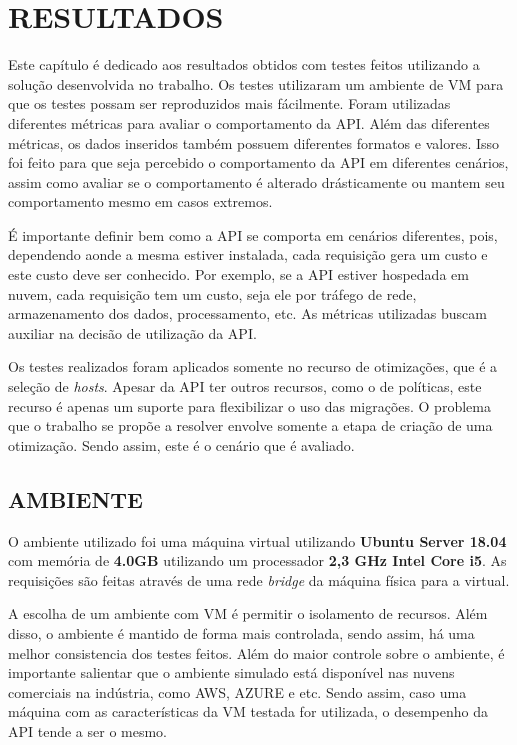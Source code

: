 \chapter{RESULTADOS}
\label{chap:results}

Este capítulo é dedicado aos resultados obtidos com testes
feitos utilizando a solução desenvolvida no trabalho. Os testes
utilizaram um ambiente de VM para que os testes possam ser reproduzidos 
mais fácilmente. Foram utilizadas diferentes métricas para avaliar
o comportamento da API. Além das diferentes métricas, os dados inseridos 
também possuem diferentes formatos e valores. Isso foi feito para que 
seja percebido o comportamento da API em diferentes cenários, assim como
avaliar se o comportamento é alterado drásticamente ou mantem seu comportamento
mesmo em casos extremos.

É importante definir bem como a API se comporta em cenários diferentes, pois,
dependendo aonde a mesma estiver instalada, cada requisição gera um custo e este custo 
deve ser conhecido. Por exemplo, se a API estiver hospedada em nuvem, cada requisição tem 
um custo, seja ele por tráfego de rede, armazenamento dos dados, processamento, etc. 
As métricas utilizadas buscam auxiliar na decisão de utilização da API.

Os testes realizados foram aplicados somente no recurso de otimizações,
que é a seleção de \textit{hosts}. Apesar da API ter outros recursos, como o de políticas,
este recurso é apenas um suporte para flexibilizar o uso das migrações. O problema 
que o trabalho se propõe a resolver envolve somente a etapa de criação de uma
otimização. Sendo assim, este é o cenário que é avaliado.

\section{AMBIENTE}

O ambiente utilizado foi uma máquina virtual utilizando \textbf{Ubuntu Server 18.04}
com memória de \textbf{4.0GB} utilizando um processador \textbf{2,3 GHz Intel Core i5}. 
As requisições são feitas através de uma rede \textit{bridge} da máquina física para a virtual.

A escolha de um ambiente com VM é permitir o isolamento de recursos. Além disso,
o ambiente é mantido de forma mais controlada, sendo assim, há uma melhor 
consistencia dos testes feitos. Além do maior controle sobre o ambiente, é importante salientar 
que o ambiente simulado está disponível nas nuvens comerciais na indústria, como AWS, AZURE e 
etc. Sendo assim, caso uma máquina com as características da VM testada for utilizada, 
o desempenho da API tende a ser o mesmo.

